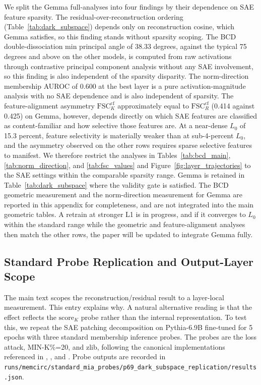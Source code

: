 We split the Gemma full-analyses into four findings by their dependence on SAE feature sparsity. The residual-over-reconstruction ordering (Table~\ref{tab:dark_subspace}) depends only on reconstruction cosine, which Gemma satisfies, so this finding stands without sparsity scoping. The BCD double-dissociation min principal angle of 38.33 degrees, against the typical 75 degrees and above on the other models, is computed from raw activations through contrastive principal component analysis without any SAE involvement, so this finding is also independent of the sparsity disparity. The norm-direction membership AUROC of 0.600 at the best layer is a pure activation-magnitude analysis with no SAE dependence and is also independent of sparsity. The feature-alignment asymmetry $\mathrm{FSC}_K^{\mathrm{cf}}$ approximately equal to $\mathrm{FSC}_R^{\mathrm{cf}}$ (0.414 against 0.425) on Gemma, however, depends directly on which SAE features are classified as content-familiar and how selective those features are. At a near-dense $L_0$ of 15.3 percent, feature selectivity is materially weaker than at sub-4-percent $L_0$, and the asymmetry observed on the other rows requires sparse selective features to manifest. We therefore restrict the analyses in Tables~\ref{tab:bcd_main}, \ref{tab:norm_direction}, and \ref{tab:fsc_values} and Figure~\ref{fig:layer_trajectories} to the SAE settings within the comparable sparsity range. Gemma is retained in Table~\ref{tab:dark_subspace} where the validity gate is satisfied. The BCD geometric measurement and the norm-direction measurement for Gemma are reported in this appendix for completeness, and are not integrated into the main geometric tables. A retrain at stronger L1 is in progress, and if it converges to $L_0$ within the standard range while the geometric and feature-alignment analyses then match the other rows, the paper will be updated to integrate Gemma fully.

\subsection{Standard Probe Replication and Output-Layer Scope}
\label{app:standard_probes}

The main text scopes the reconstruction/residual result to a layer-local measurement. This entry explains why. A natural alternative reading is that the effect reflects the $\mathrm{score}_K$ probe rather than the internal representation. To test this, we repeat the SAE patching decomposition on Pythia-6.9B fine-tuned for 5 epochs with three standard membership inference probes. The probes are the loss attack, MIN-K\%=20, and zlib, following the canonical implementations referenced in \citet{yeom2018privacy}, \citet{shi2023detecting}, and \citet{carlini2021extracting}. Probe outputs are recorded in \texttt{runs/\allowbreak{}memcirc/\allowbreak{}standard\_\allowbreak{}mia\_\allowbreak{}probes/\allowbreak{}p69\_\allowbreak{}dark\_\allowbreak{}subspace\_\allowbreak{}replication/\allowbreak{}results.json}.

